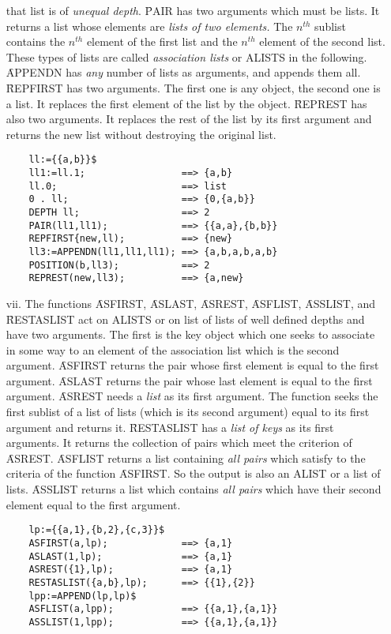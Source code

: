 \begin{itemize}
that list is of {\em unequal depth}.
\f{PAIR} has two arguments which must be lists. It returns a list
whose elements are {\em lists of two elements.}  The $n^{th}$ sublist
contains the $n^{th}$ element of the first list and the $n^{th}$
element of the second list. These types of lists are called {\em
association lists} or ALISTS in the following.
\f{APPENDN} has {\em any} number of lists as arguments, and appends
them all.
\f{REPFIRST} has two arguments. The first one is any object, the
second one is a list. It replaces the first element of the list by the
object.
\f{REPREST} has also two arguments. It replaces the rest of the list
by its first argument and returns the new list without destroying the
original list.
\begin{verbatim}
	ll:={{a,b}}$
	ll1:=ll.1;                 ==> {a,b}
	ll.0;                      ==> list
	0 . ll;                    ==> {0,{a,b}}
	DEPTH ll;                  ==> 2
	PAIR(ll1,ll1);             ==> {{a,a},{b,b}}
	REPFIRST{new,ll);          ==> {new}
	ll3:=APPENDN(ll1,ll1,ll1); ==> {a,b,a,b,a,b}
	POSITION(b,ll3);           ==> 2
	REPREST(new,ll3);          ==> {a,new}
\end{verbatim}
\item[vii.]
The functions \f{ASFIRST},
\f{ASLAST}, \f{ASREST},
\f{ASFLIST}, \f{ASSLIST},
and \f{RESTASLIST}
act on ALISTS or on list of lists of well defined depths
and have two arguments. The first is the key object
which one seeks to associate in some way to an element of the association
list which is the second argument.  \f{ASFIRST} returns the pair whose
first element is equal to the first argument.  \f{ASLAST} returns the
pair whose last element is equal to the first argument.  \f{ASREST}
needs a {\em list} as its first argument.  The function seeks the first
sublist of a list of lists (which is its second argument)
equal to its first argument and returns it.
\f{RESTASLIST} has a {\em list of keys} as its first arguments.  It
returns the collection of pairs which meet the criterion of \f{ASREST}.
\f{ASFLIST} returns a list containing {\em all pairs} which
satisfy to the criteria of the function \f{ASFIRST}. So the output
is also an ALIST or a list of lists.
\f{ASSLIST} returns a list which contains {\em all pairs} which have
their second element equal to the first argument.
\begin{verbatim}
	lp:={{a,1},{b,2},{c,3}}$
	ASFIRST(a,lp);             ==> {a,1}
	ASLAST(1,lp);              ==> {a,1}
	ASREST({1},lp);            ==> {a,1}
	RESTASLIST({a,b},lp);      ==> {{1},{2}}
	lpp:=APPEND(lp,lp)$
	ASFLIST(a,lpp);            ==> {{a,1},{a,1}}
	ASSLIST(1,lpp);            ==> {{a,1},{a,1}}
\end{verbatim}
\end{itemize}

